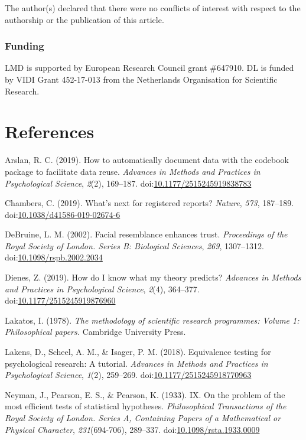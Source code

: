 \documentclass[doc,floatsintext]{apa6}
\begin{document}
The author(s) declared that there were no conflicts of interest with respect to the authorship or the publication of this article.

\hypertarget{funding}{%
\subsubsection{Funding}\label{funding}}

LMD is supported by European Research Council grant \#647910. DL is funded by VIDI Grant 452-17-013 from the Netherlands Organisation for Scientific Research.

\newpage

\hypertarget{references}{%
\section{References}\label{references}}

\begingroup
\setlength{\parindent}{-0.5in}
\setlength{\leftskip}{0.5in}

\hypertarget{refs}{}
\leavevmode\hypertarget{ref-arslan2019}{}%
Arslan, R. C. (2019). How to automatically document data with the codebook package to facilitate data reuse. \emph{Advances in Methods and Practices in Psychological Science}, \emph{2}(2), 169--187. doi:\href{https://doi.org/10.1177/2515245919838783}{10.1177/2515245919838783}

\leavevmode\hypertarget{ref-chambers2019}{}%
Chambers, C. (2019). What's next for registered reports? \emph{Nature}, \emph{573}, 187--189. doi:\href{https://doi.org/10.1038/d41586-019-02674-6}{10.1038/d41586-019-02674-6}

\leavevmode\hypertarget{ref-debruine2002}{}%
DeBruine, L. M. (2002). Facial resemblance enhances trust. \emph{Proceedings of the Royal Society of London. Series B: Biological Sciences}, \emph{269}, 1307--1312. doi:\href{https://doi.org/10.1098/rspb.2002.2034}{10.1098/rspb.2002.2034}

\leavevmode\hypertarget{ref-dienes2019}{}%
Dienes, Z. (2019). How do I know what my theory predicts? \emph{Advances in Methods and Practices in Psychological Science}, \emph{2}(4), 364--377. doi:\href{https://doi.org/10.1177/2515245919876960}{10.1177/2515245919876960}

\leavevmode\hypertarget{ref-lakatos1978}{}%
Lakatos, I. (1978). \emph{The methodology of scientific research programmes: Volume 1: Philosophical papers.} Cambridge University Press.

\leavevmode\hypertarget{ref-lakens2018}{}%
Lakens, D., Scheel, A. M., \& Isager, P. M. (2018). Equivalence testing for psychological research: A tutorial. \emph{Advances in Methods and Practices in Psychological Science}, \emph{1}(2), 259--269. doi:\href{https://doi.org/10.1177/2515245918770963}{10.1177/2515245918770963}

\leavevmode\hypertarget{ref-neyman1933}{}%
Neyman, J., Pearson, E. S., \& Pearson, K. (1933). IX. On the problem of the most efficient tests of statistical hypotheses. \emph{Philosophical Transactions of the Royal Society of London. Series A, Containing Papers of a Mathematical or Physical Character}, \emph{231}(694-706), 289--337. doi:\href{https://doi.org/10.1098/rsta.1933.0009}{10.1098/rsta.1933.0009}

\endgroup
\end{document}
